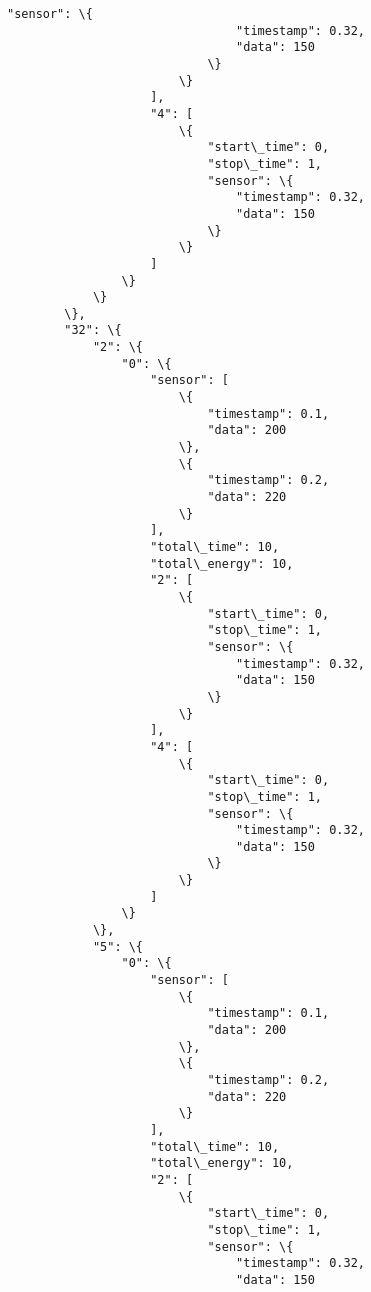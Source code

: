 \documentclass[11pt]{article}
\begin{document}
\begin{Verbatim}[commandchars=\\\{\}]
                            "sensor": \{
                                "timestamp": 0.32,
                                "data": 150
                            \}
                        \}
                    ],
                    "4": [
                        \{
                            "start\_time": 0,
                            "stop\_time": 1,
                            "sensor": \{
                                "timestamp": 0.32,
                                "data": 150
                            \}
                        \}
                    ]
                \}
            \}
        \},
        "32": \{
            "2": \{
                "0": \{
                    "sensor": [
                        \{
                            "timestamp": 0.1,
                            "data": 200
                        \},
                        \{
                            "timestamp": 0.2,
                            "data": 220
                        \}
                    ],
                    "total\_time": 10,
                    "total\_energy": 10,
                    "2": [
                        \{
                            "start\_time": 0,
                            "stop\_time": 1,
                            "sensor": \{
                                "timestamp": 0.32,
                                "data": 150
                            \}
                        \}
                    ],
                    "4": [
                        \{
                            "start\_time": 0,
                            "stop\_time": 1,
                            "sensor": \{
                                "timestamp": 0.32,
                                "data": 150
                            \}
                        \}
                    ]
                \}
            \},
            "5": \{
                "0": \{
                    "sensor": [
                        \{
                            "timestamp": 0.1,
                            "data": 200
                        \},
                        \{
                            "timestamp": 0.2,
                            "data": 220
                        \}
                    ],
                    "total\_time": 10,
                    "total\_energy": 10,
                    "2": [
                        \{
                            "start\_time": 0,
                            "stop\_time": 1,
                            "sensor": \{
                                "timestamp": 0.32,
                                "data": 150

\end{Verbatim}
\end{document}
